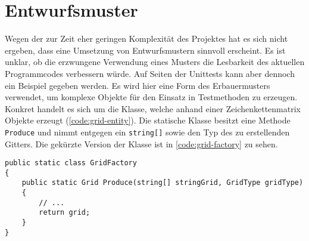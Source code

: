 \part{Entwurfsmuster}
Wegen der zur Zeit eher geringen Komplexität des Projektes hat es sich
nicht ergeben, dass eine Umsetzung von Entwurfsmustern sinnvoll erscheint.
Es ist unklar, ob die erzwungene Verwendung eines Musters
die Lesbarkeit des aktuellen Programmcodes verbessern würde.
Auf Seiten der Unittests kann aber dennoch ein Beispiel gegeben werden.
Es wird hier eine Form des Erbauermusters verwendet, um
komplexe Objekte für den Einsatz in Testmethoden zu erzeugen.
Konkret handelt es sich um die 
Klasse, welche anhand einer Zeichenkettenmatrix 
Objekte erzeugt (\ref{code:grid-entity}).
Die statische Klasse besitzt eine Methode \lstinline{Produce}
und nimmt entgegen ein \lstinline{string[]} sowie den Typ des
zu erstellenden Gitters. Die gekürzte Version der Klasse ist in
\autoref{code:grid-factory} zu sehen.
\begin{lstlisting}[caption={{\inlinecode[\colorClasses]{GridFactory}} Klasse},
  label={code:grid-factory}]
public static class GridFactory
{
    public static Grid Produce(string[] stringGrid, GridType gridType)
    {
        // ...
        return grid;
    }
}
\end{lstlisting}
